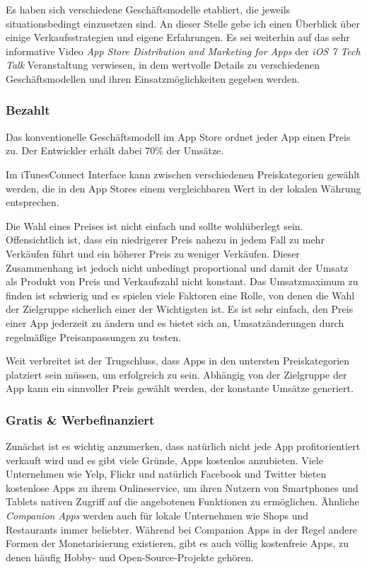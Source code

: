 \documentclass[parskip=half, final]{scrreprt}
\begin{document}
Es haben sich verschiedene Geschäftsmodelle etabliert, die jeweils situationsbedingt einzusetzen sind. An dieser Stelle gebe ich einen Überblick über einige Verkaufsstrategien und eigene Erfahrungen. Es sei weiterhin auf das sehr informative Video \emph{App Store Distribution and Marketing for Apps } der \emph{iOS 7 Tech Talk} Veranstaltung verwiesen, in dem wertvolle Details zu verschiedenen Geschäftsmodellen und ihren Einsatzmöglichkeiten gegeben werden.

\subsubsection{Bezahlt}

Das konventionelle Geschäftsmodell im App Store ordnet jeder App einen Preis zu. Der Entwickler erhält dabei 70\% der Umsätze.

Im iTunesConnect Interface kann zwischen verschiedenen Preiskategorien gewählt werden, die in den App Stores einem vergleichbaren Wert in der lokalen Währung entsprechen.

Die Wahl eines Preises ist nicht einfach und sollte wohlüberlegt sein. Offensichtlich ist, dass ein niedrigerer Preis nahezu in jedem Fall zu mehr Verkäufen führt und ein höherer Preis zu weniger Verkäufen. Dieser Zusammenhang ist jedoch nicht unbedingt proportional und damit der Umsatz als Produkt von Preis und Verkaufszahl nicht konstant. Das Umsatzmaximum zu finden ist schwierig und es spielen viele Faktoren eine Rolle, von denen die Wahl der Zielgruppe sicherlich einer der Wichtigsten ist. Es ist sehr einfach, den Preis einer App jederzeit zu ändern und es bietet sich an, Umsatzänderungen durch regelmäßige Preisanpassungen zu testen.

Weit verbreitet ist der Trugschluss, dass Apps in den untersten Preiskategorien platziert sein müssen, um erfolgreich zu sein. Abhängig von der Zielgruppe der App kann ein sinnvoller Preis gewählt werden, der konstante Umsätze generiert.

\subsubsection{Gratis \& Werbefinanziert}

Zunächst ist es wichtig anzumerken, dass natürlich nicht jede App profitorientiert verkauft wird und es gibt viele Gründe, Apps kostenlos anzubieten. Viele Unternehmen wie Yelp, Flickr und natürlich Facebook und Twitter bieten kostenlose Apps zu ihrem Onlineservice, um ihren Nutzern von Smartphones und Tablets nativen Zugriff auf die angebotenen Funktionen zu ermöglichen. Ähnliche \emph{Companion Apps} werden auch für lokale Unternehmen wie Shops und Restaurants immer beliebter. Während bei Companion Apps in der Regel andere Formen der Monetarisierung existieren, gibt es auch völlig kostenfreie Apps, zu denen häufig Hobby- und Open-Source-Projekte gehören.
\end{document}
